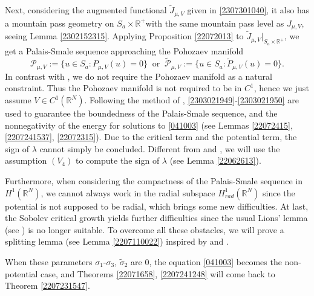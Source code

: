 \documentclass[10pt]{article}
\numberwithin{equation}{section}
\numberwithin{equation}{section}
\begin{document}
Next, considering the augmented functional $\widetilde{J}_{\mu, V}$ given in \eqref{2307301040}, it also has a mountain pass geometry on $S_a\times \mathbb{R}^+$with the same mountain pass level as ${J}_{\mu, V}$, seeing Lemma \ref{2302152315}. Applying Proposition \ref{22072013} to $\widetilde{J}_{\mu, V}|_{S_a\times \mathbb{R}^+}$, we get a Palais-Smale sequence approaching the Pohozaev manifold
\[
\mathcal{P}_{\mu, V}:= \big\{u\in S_a: {P}_{\mu, V}(u)=0 \big\}\;\; \text{or}\;\; \widetilde{\mathcal{P}}_{\mu, V}:= \big\{u\in S_a: \widetilde{P}_{\mu, V}(u)=0 \big\}.
\]
In contrast with \cite{DZ2022}, we do not require the Pohozaev manifold as a natural constraint. Thus the Pohozaev manifold is not required to be in $C^1$, hence we just assume $V\in C^1(\mathbb{R}^N)$. Following the method of \cite{BMRV2021,MRV2022}, \eqref{2303021949}-\eqref{2303021950} are used to guarantee the boundedness of the Palais-Smale sequence, and the nonnegativity of the energy for solutions to \eqref{041003} (see Lemmas \ref{22072415}, \ref{2207241537}, \ref{22072315}). Due to the critical term and the potential term, the sign of $\lambda$ cannot simply be concluded. Different from \cite{MRV2022} and \cite{DZ2022},  we will use the assumption $(V_4)$ to compute the sign of $\lambda$ (see Lemma \ref{22062613}).

Furthermore, when considering the compactness of the Palais-Smale sequence in $H^1(\mathbb{R}^N)$, we cannot always work in the radial subspace $H_{rad}^1(\mathbb{R}^N)$ since the potential is not supposed to be radial, which brings some new difficulties. At last, the Sobolev critical growth yields further difficulties since the usual Lions' lemma (see \cite[Theorem 1.34]{Willem96}) is no longer suitable. To overcome all these obstacles, we will prove a splitting lemma (see Lemma \ref{2207110022}) inspired by \cite{BMRV2021, MRV2022} and \cite[Proposition 3.1]{Soave20_JFA}. 

When these parameters $\sigma_1$-$\sigma_3$, $\widetilde{\sigma}_2$ are 0, the equation \eqref{041003} becomes the non-potential case, and Theorems \ref{22071658}, \ref{2207241248} will come back to Theorem \ref{2207231547}. 
\end{document}
